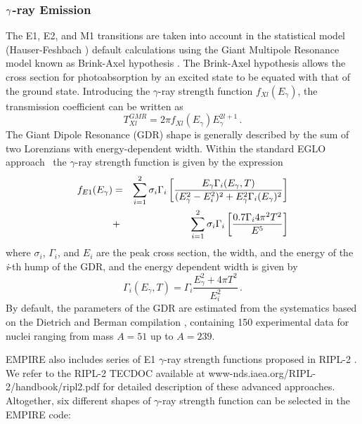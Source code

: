 \subsubsection{$\protect\gamma$-ray Emission}

The E1, E2, and M1 transitions are taken into account in the statistical
model (Hauser-Feshbach%
) default calculations using the Giant Multipole
Resonance model known as Brink-Axel hypothesis \cite{Axel,Brink,Brinka}. The
Brink-Axel hypothesis allows the cross section for photoabsorption by an
excited state to be equated with that of the ground state. Introducing the $%
\gamma$-ray strength function $f_{Xl}(E_{\gamma})$, the transmission
coefficient can be written as
\begin{equation}
T_{Xl}^{GMR}=2\pi f_{Xl}(E_{\gamma})E_{\gamma}^{2l+1}\,.  \label{tgGMR}
\end{equation}
The Giant Dipole Resonance (GDR) shape is generally described by the sum of
two Lorenzians with energy-dependent width. Within the standard EGLO
approach~\cite{kop01} the $\gamma$-ray strength function is given by the
expression \noindent
\begin{eqnarray}
f_{E1}(E_{\gamma})&=&\sum_{i=1}^{2}\sigma_{i}\Gamma_{i}\left[%
\frac{E_{\gamma}\Gamma_{i}(E_{\gamma},T)}{(E_{\gamma}^{2}-E_{i}^{2})^{2}+E_{%
\gamma}^{2}\Gamma_{i}(E_{\gamma})^{2}}\right]  \notag \\
&+&\sum_{i=1}^{2}\sigma_{i}\Gamma_{i}\left[\frac{0.7\Gamma_{i}4\pi^{2}T^{2}}{%
E^{5}}\right]  \label{lorenz}
\end{eqnarray}
\noindent where $\sigma_{i}$, $\Gamma_{i}$, and $E_{i}$ are the peak cross
section, the width, and the energy of the \emph{i}-th hump of the GDR, and
the energy dependent width is given by
\begin{equation}
\Gamma_{i}(E_{\gamma},T)=\Gamma_{i}\frac{E_{\gamma}^{2}+4\pi T^{2}}{E_{i}^{2}%
}\,.
\end{equation}
By default, the parameters of the GDR are estimated from the systematics
based on the Dietrich and Berman compilation \cite{die88}, containing 150
experimental data for nuclei ranging from mass $A=51$ up to $A=239$.

EMPIRE also includes series of E1 $\gamma$-ray strength functions proposed
in RIPL-2 \cite{RIPL2}. We refer to the RIPL-2 TECDOC available at
www-nds.iaea.org/RIPL-2/handbook/ripl2.pdf for detailed description of these
advanced approaches. Altogether, six different shapes of $\gamma$-ray
strength function can be selected in the EMPIRE code:

